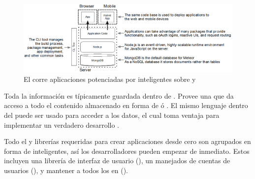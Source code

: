 \begin{figure}[h!]
	\centering
	\includegraphics[width=1.0\textwidth]{figuras/meteor_stack.png}
	\caption{El \stackAS \meteorNAME corre aplicaciones potenciadas por \packagesAS inteligentes sobre \nodejsNAME y \mongodbNAME}
	\label{figure:meteor_stack}
\end{figure}

Toda la información es típicamente guardada dentro de \mongodbNAME. Provee una \api \javaScriptNAME que da acceso a todo el contenido almacenado en forma de \documentsDB ó \objectsPL. El mismo lenguaje dentro del \browserINT puede ser usado para acceder a los datos, el cual \meteorNAME toma ventaja para implementar un verdadero desarrollo \fullstackAS.

Todo el \softwarePC y librerías requeridas para crear aplicaciones \webINT desde cero son agrupados en forma de \packagesAS inteligentes, así los desarrolladores pueden empezar de inmediato. Estos \packagesAS incluyen una librería de interfaz de usuario (\blazemeteor), un manejados de cuentas de usuarios (\accountsmeteor), y mantener a todos los \clientsAS \reactively \updated en \realTimeINT (\trackermeteor).

